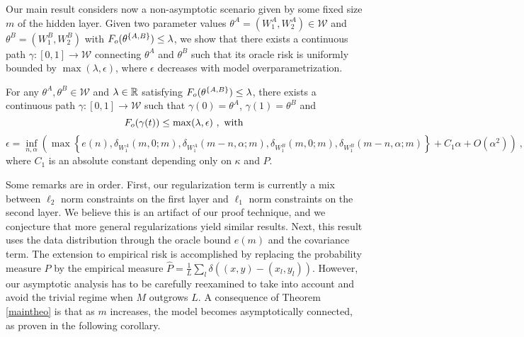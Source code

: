 Our main result considers now a non-asymptotic scenario given by some fixed
size $m$ of the hidden layer. Given two parameter values $\theta^A = (W_1^A, W_2^A) \in \mathcal{W}$ 
and $\theta^B= (W_1^B, W_2^B)$ with $F_{o}(\theta^{\{A,B\} } ) \leq \lambda$, 
we show that there exists a continuous path 
$\gamma: [0,1] \to \mathcal{W}$ connecting $\theta^A$ and $\theta^B$ 
such that its oracle risk is uniformly bounded by $\max(\lambda, \epsilon)$, where $\epsilon$ 
decreases with model overparametrization. 
\begin{theorem}
\label{maintheo}
For any $\theta^A, \theta^B \in \mathcal{W}$ and $\lambda \in {\mathbb{R}}$ satisfying $F_{o}(\theta^{\{A,B\}}) \leq \lambda$, there exists a continuous path $\gamma: [0,1] \to \mathcal{W}$ such that
$\gamma(0) = \theta^A$, $\gamma(1) = \theta^B$ and
\begin{equation}
F_{o}( \gamma(t) )  \leq \max( \lambda, \epsilon)~,\text{ with}
\end{equation}
\begin{equation}
\epsilon = \inf_{n, \alpha} \left(\max \left\{ e(n), \delta_{W_1^A}(m, 0; m ) , \delta_{W_1^A}(m-n, \alpha; m ) ,  \delta_{W_1^B}(m, 0; m ) , \delta_{W_1^B}(m-n, \alpha; m ) \right\} + C_1 \alpha  + O(\alpha^2) \right)~,
\end{equation}
where $C_1$ is an absolute constant depending only on $\kappa$ and $P$.
\end{theorem}
Some remarks are in order. First, our regularization term is currently a mix between $\ell_2$ norm constraints on the first layer and $\ell_1$ norm constraints on the second layer. We believe this is an artifact of our proof technique, and we conjecture that more general regularizations yield similar results. Next, this result uses the data distribution through the oracle bound $e(m)$ and the covariance term. The 
extension to empirical risk is accomplished by replacing the probability measure $P$ by the empirical measure $\hat{P} = \frac{1}{L} \sum_l \delta\left( (x,y) - (x_l, y_l)\right) $. However, our asymptotic analysis has to be carefully reexamined to take into account and avoid the trivial regime when $M$ outgrows $L$.  
A consequence of Theorem \ref{maintheo} is that as $m$ increases, the model becomes asymptotically connected, as proven in the following corollary.
